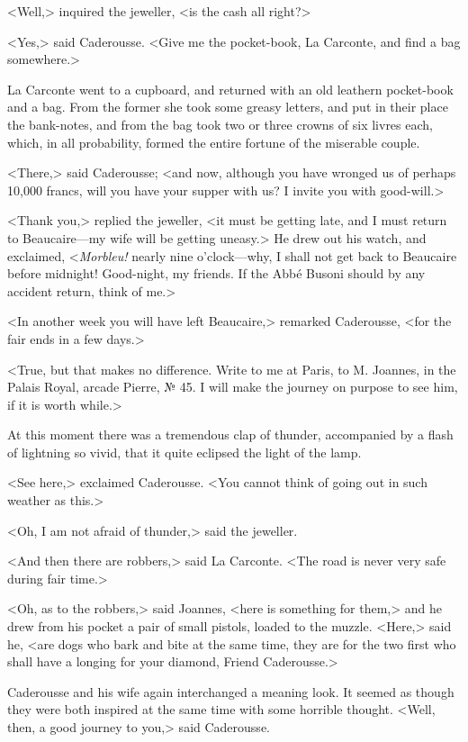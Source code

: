 {<Well,> inquired the jeweller, <is the cash all right?> 

<Yes,> said Caderousse. <Give me the pocket-book, La Carconte, and find a bag somewhere.> 

La Carconte went to a cupboard, and returned with an old leathern pocket-book and a bag. From the former she took some greasy letters, and put in their place the bank-notes, and from the bag took two or three crowns of six livres each, which, in all probability, formed the entire fortune of the miserable couple. 

<There,> said Caderousse; <and now, although you have wronged us of perhaps 10,000 francs, will you have your supper with us? I invite you with good-will.> 

<Thank you,> replied the jeweller, <it must be getting late, and I must return to Beaucaire—my wife will be getting uneasy.> He drew out his watch, and exclaimed, <\textit{Morbleu!} nearly nine o'clock—why, I shall not get back to Beaucaire before midnight! Good-night, my friends. If the Abbé Busoni should by any accident return, think of me.> 

<In another week you will have left Beaucaire,> remarked Caderousse, <for the fair ends in a few days.> 

<True, but that makes no difference. Write to me at Paris, to M. Joannes, in the Palais Royal, arcade Pierre, № 45. I will make the journey on purpose to see him, if it is worth while.> 

At this moment there was a tremendous clap of thunder, accompanied by a flash of lightning so vivid, that it quite eclipsed the light of the lamp.  

<See here,> exclaimed Caderousse. <You cannot think of going out in such weather as this.> 

<Oh, I am not afraid of thunder,> said the jeweller. 

<And then there are robbers,> said La Carconte. <The road is never very safe during fair time.> 

<Oh, as to the robbers,> said Joannes, <here is something for them,> and he drew from his pocket a pair of small pistols, loaded to the muzzle. <Here,> said he, <are dogs who bark and bite at the same time, they are for the two first who shall have a longing for your diamond, Friend Caderousse.> 

Caderousse and his wife again interchanged a meaning look. It seemed as though they were both inspired at the same time with some horrible thought. <Well, then, a good journey to you,> said Caderousse. 

}
